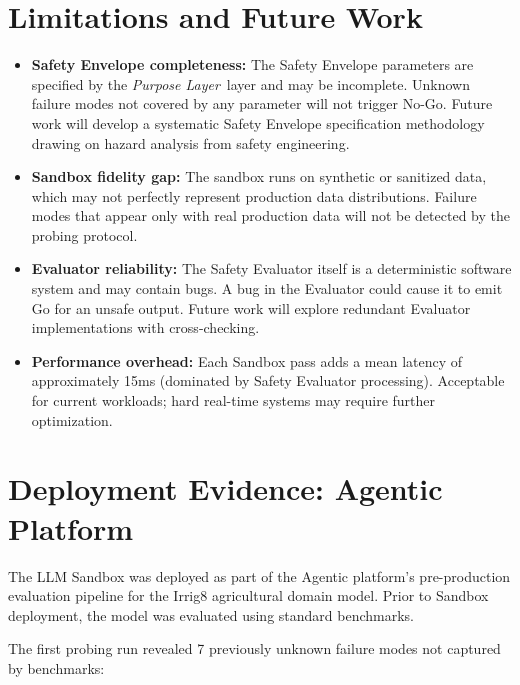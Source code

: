 \documentclass[12pt]{article}
\newcommand{\purpose}{\textit{Purpose Layer}}
\begin{document}
\section{Limitations and Future Work}
\label{sec:limitations}

\begin{itemize}
    \item \textbf{Safety Envelope completeness:} The Safety Envelope parameters are specified by the \purpose\ layer and may be incomplete. Unknown failure modes not covered by any parameter will not trigger No-Go. Future work will develop a systematic Safety Envelope specification methodology drawing on hazard analysis from safety engineering.
    \item \textbf{Sandbox fidelity gap:} The sandbox runs on synthetic or sanitized data, which may not perfectly represent production data distributions. Failure modes that appear only with real production data will not be detected by the probing protocol.
    \item \textbf{Evaluator reliability:} The Safety Evaluator itself is a deterministic software system and may contain bugs. A bug in the Evaluator could cause it to emit Go for an unsafe output. Future work will explore redundant Evaluator implementations with cross-checking.
    \item \textbf{Performance overhead:} Each Sandbox pass adds a mean latency of approximately 15ms (dominated by Safety Evaluator processing). Acceptable for current workloads; hard real-time systems may require further optimization.
\end{itemize}

\section{Deployment Evidence: Agentic Platform}
\label{sec:deployment}

The LLM Sandbox was deployed as part of the Agentic platform's pre-production evaluation pipeline for the Irrig8 agricultural domain model. Prior to Sandbox deployment, the model was evaluated using standard benchmarks.

The first probing run revealed 7 previously unknown failure modes not captured by benchmarks:
\end{document}
